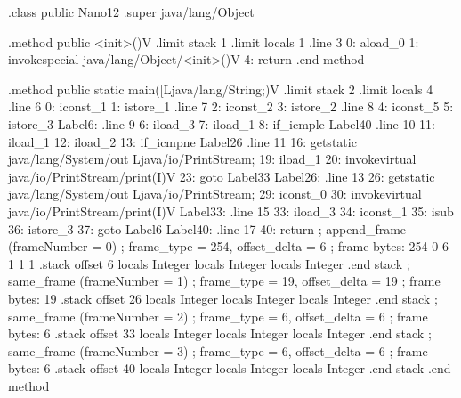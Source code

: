 \documentclass[12pt,a4paper,twoside]{report}
\begin{document}
\begin{terminal}
.class public Nano12
.super java/lang/Object

.method public <init>()V
  .limit stack 1
  .limit locals 1
  .line 3
  0: aload_0
  1: invokespecial java/lang/Object/<init>()V
  4: return
.end method

.method public static main([Ljava/lang/String;)V
  .limit stack 2
  .limit locals 4
  .line 6
  0: iconst_1
  1: istore_1
  .line 7
  2: iconst_2
  3: istore_2
  .line 8
  4: iconst_5
  5: istore_3
Label6:
  .line 9
  6: iload_3
  7: iload_1
  8: if_icmple Label40
  .line 10
  11: iload_1
  12: iload_2
  13: if_icmpne Label26
  .line 11
  16: getstatic java/lang/System/out Ljava/io/PrintStream;
  19: iload_1
  20: invokevirtual java/io/PrintStream/print(I)V
  23: goto Label33
Label26:
  .line 13
  26: getstatic java/lang/System/out Ljava/io/PrintStream;
  29: iconst_0
  30: invokevirtual java/io/PrintStream/print(I)V
Label33:
  .line 15
  33: iload_3
  34: iconst_1
  35: isub
  36: istore_3
  37: goto Label6
Label40:
  .line 17
  40: return
  ; append_frame (frameNumber = 0)
  ; frame_type = 254, offset_delta = 6
  ; frame bytes: 254 0 6 1 1 1
  .stack
    offset 6
    locals Integer
    locals Integer
    locals Integer
    .end stack
  ; same_frame (frameNumber = 1)
  ; frame_type = 19, offset_delta = 19
  ; frame bytes: 19
  .stack
    offset 26
    locals Integer
    locals Integer
    locals Integer
    .end stack
  ; same_frame (frameNumber = 2)
  ; frame_type = 6, offset_delta = 6
  ; frame bytes: 6
  .stack
    offset 33
    locals Integer
    locals Integer
    locals Integer
    .end stack
  ; same_frame (frameNumber = 3)
  ; frame_type = 6, offset_delta = 6
  ; frame bytes: 6
  .stack
    offset 40
    locals Integer
    locals Integer
    locals Integer
    .end stack
.end method

\end{terminal}
\end{document}
